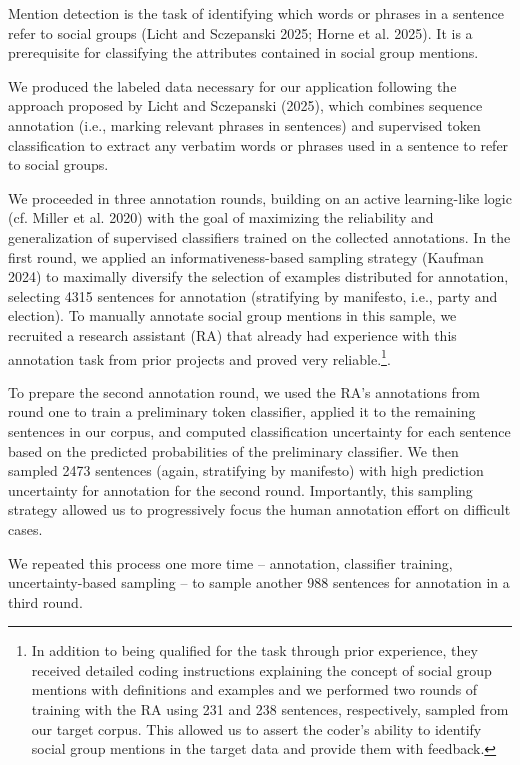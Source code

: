 \documentclass[12pt]{article}
\begin{document}
Mention detection is the task of identifying which words or phrases in a sentence refer to social groups (Licht and Sczepanski 2025; Horne et al. 2025).
It is a prerequisite for classifying the attributes contained in social group mentions.

We produced the labeled data necessary for our application following the approach proposed by Licht and Sczepanski (2025), which combines sequence annotation (i.e., marking relevant phrases in sentences) and supervised token classification to extract any verbatim words or phrases used in a sentence to refer to social groups.

We proceeded in three annotation rounds, building on an active learning-like logic (cf. Miller et al. 2020) with the goal of maximizing the reliability and generalization of supervised classifiers trained on the collected annotations.
In the first round, we applied an informativeness-based sampling strategy (Kaufman 2024) to maximally diversify the selection of examples distributed for annotation, selecting 4315 sentences for annotation (stratifying by manifesto, i.e., party and election).
To manually annotate social group mentions in this sample, we recruited a research assistant (RA) that already had experience with this annotation task from prior projects and proved very reliable.\footnote{In addition to being qualified for the task through prior experience, they received detailed coding instructions explaining the concept of social group mentions with definitions and examples and we performed two rounds of training with the RA using 231 and 238 sentences, respectively, sampled from our target corpus.
  This allowed us to assert the coder's ability to identify social group mentions in the target data and provide them with feedback.
}.

To prepare the second annotation round, we used the RA's annotations from round one to train a preliminary token classifier, applied it to the remaining sentences in our corpus, and computed classification uncertainty for each sentence based on the predicted probabilities of the preliminary classifier.
We then sampled 2473 sentences (again, stratifying by manifesto) with high prediction uncertainty for annotation for the second round.
Importantly, this sampling strategy allowed us to progressively focus the human annotation effort on difficult cases.

We repeated this process one more time -- annotation, classifier training, uncertainty-based sampling -- to sample another 988 sentences for annotation in a third round.
\end{document}
